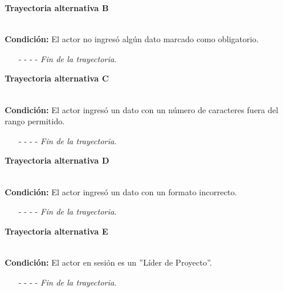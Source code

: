 \hypertarget{CU12-5:TAB}{\textbf{Trayectoria alternativa B}}\\
\noindent \textbf{Condición:} El actor no ingresó algún dato marcado como obligatorio.
\begin{enumerate}
	\UCpaso[\UCsist] Muestra el mensaje  señalando el campo que presenta el error en la pantalla .
	\UCpaso Regresa al paso \ref{CU12.5-P5} de la Trayectoria principal o al paso \ref{CU12.5-TAP2} de la Trayectoria alternativa B.
	\item[- -] - - {\em {Fin de la trayectoria}}.%
\end{enumerate}
\hypertarget{CU12-5:TAC}{\textbf{Trayectoria alternativa C}}\\
\noindent \textbf{Condición:} El actor ingresó un dato con un número de caracteres fuera del rango permitido.
\begin{enumerate}
	\UCpaso[\UCsist] Muestra el mensaje  señalando el campo que presenta el error en la pantalla .
	\UCpaso Regresa al paso \ref{CU12.5-P5} de la Trayectoria principal o al paso \ref{CU12.5-TAP2} de la Trayectoria alternativa B.
	\item[- -] - - {\em {Fin de la trayectoria}}.%
\end{enumerate}
\hypertarget{CU12-5:TAD}{\textbf{Trayectoria alternativa D}}\\
\noindent \textbf{Condición:} El actor ingresó un dato con un formato incorrecto.
\begin{enumerate}
	\UCpaso[\UCsist] Muestra el mensaje  señalando el campo que presenta el error en la pantalla .
	\UCpaso Regresa al paso \ref{CU12.5-P5} de la Trayectoria principal o al paso \ref{CU12.5-TAP2} de la Trayectoria alternativa B.
	\item[- -] - - {\em {Fin de la trayectoria}}.
\end{enumerate}
\hypertarget{CU12-5:TAE}{\textbf{Trayectoria alternativa E}}\\
\noindent \textbf{Condición:} El actor en sesión es un ''Líder de Proyecto''.
\begin{enumerate}
	\UCpaso[\UCsist] Cambia el estado del caso de uso a ''Liberado''.
	\UCpaso Continúa en el paso \ref{CU12.5-P12} de la Trayectoria principal.
	\item[- -] - - {\em {Fin de la trayectoria}}.
\end{enumerate}